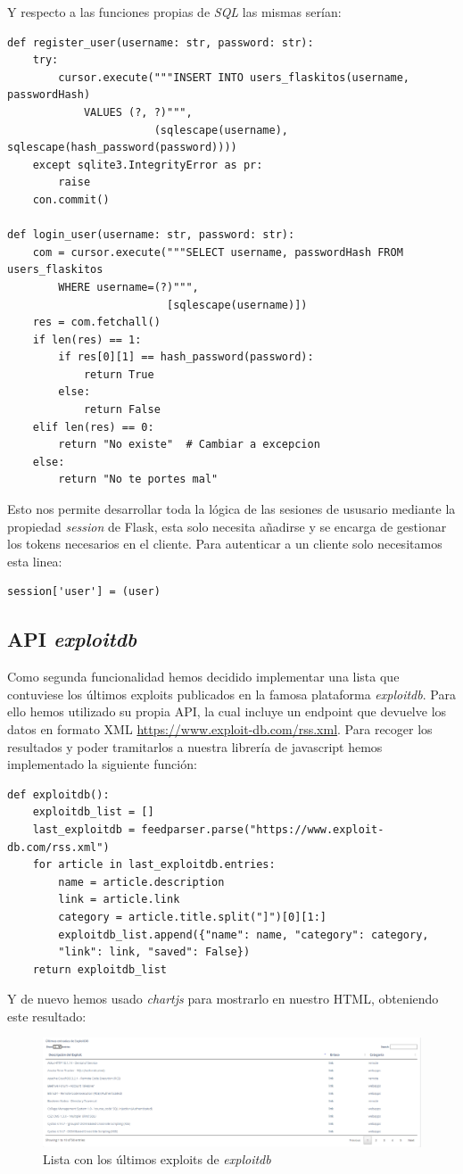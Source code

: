 \documentclass[12pt, a4paper,twoside,titlepage]{article}
\begin{document}
Y respecto a las funciones propias de \emph{SQL} las mismas serían:
\begin{verbatim}
def register_user(username: str, password: str):
    try:
        cursor.execute("""INSERT INTO users_flaskitos(username, passwordHash)
            VALUES (?, ?)""",
                       (sqlescape(username), sqlescape(hash_password(password))))
    except sqlite3.IntegrityError as pr:
        raise
    con.commit()

def login_user(username: str, password: str):
    com = cursor.execute("""SELECT username, passwordHash FROM users_flaskitos
        WHERE username=(?)""",
                         [sqlescape(username)])
    res = com.fetchall()
    if len(res) == 1:
        if res[0][1] == hash_password(password):
            return True
        else:
            return False
    elif len(res) == 0:
        return "No existe"  # Cambiar a excepcion
    else:
        return "No te portes mal"
\end{verbatim}
Esto nos permite desarrollar toda la lógica de las sesiones de ususario mediante la propiedad \emph{session} de Flask, esta solo necesita añadirse y se encarga de gestionar los tokens necesarios en el cliente. Para autenticar a un cliente solo necesitamos esta linea:
\begin{verbatim}
session['user'] = (user)
\end{verbatim}
\subsection{API \emph{exploitdb}}
Como segunda funcionalidad hemos decidido implementar una lista que contuviese los últimos exploits publicados en la famosa plataforma \emph{exploitdb}. Para ello hemos utilizado su propia API, la cual incluye un endpoint que devuelve los datos en formato XML \url{https://www.exploit-db.com/rss.xml}. Para recoger los resultados y poder tramitarlos a nuestra librería de javascript hemos implementado la siguiente función:
\begin{verbatim}
def exploitdb():
    exploitdb_list = []
    last_exploitdb = feedparser.parse("https://www.exploit-db.com/rss.xml")
    for article in last_exploitdb.entries:
        name = article.description
        link = article.link
        category = article.title.split("]")[0][1:]
        exploitdb_list.append({"name": name, "category": category,
        "link": link, "saved": False})
    return exploitdb_list
\end{verbatim}
Y de nuevo hemos usado \emph{chartjs} para mostrarlo en nuestro HTML, obteniendo este resultado:
\begin{figure}[H]
    \centering
    \includegraphics[width=1\linewidth]{Figuras/exploit-list.png}
    \caption{Lista con los últimos exploits de \emph{exploitdb}}
    \label{fig:exploitlist}
\end{figure}
\end{document}
